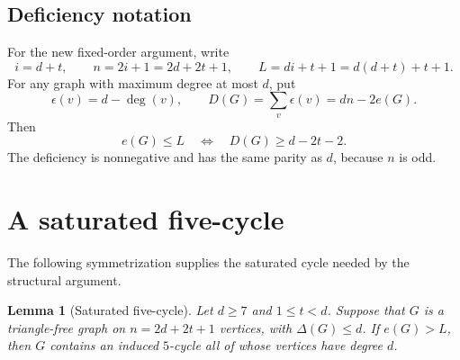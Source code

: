 \documentclass[11pt]{article}
\newtheorem{lemma}[theorem]{Lemma}
\theoremstyle{definition}
\theoremstyle{remark}
\begin{document}
\subsection{Deficiency notation}

For the new fixed-order argument, write
\[
  i=d+t,\qquad n=2i+1=2d+2t+1,\qquad
  L=di+t+1=d(d+t)+t+1.
\]
For any graph with maximum degree at most $d$, put
\[
  \epsilon(v)=d-\deg(v),\qquad D(G)=\sum_v\epsilon(v)=dn-2e(G).
\]
Then
\begin{equation}\label{eq:target-deficiency}
  e(G)\le L\quad\Longleftrightarrow\quad D(G)\ge d-2t-2.
\end{equation}
The deficiency is nonnegative and has the same parity as $d$, because $n$
is odd.

\section{A saturated five-cycle}\label{sec:saturated-cycle}

The following symmetrization supplies the saturated cycle needed by the structural argument.

\begin{lemma}[Saturated five-cycle]\label{lem:saturated-cycle}
Let $d\ge7$ and $1\le t<d$. Suppose that $G$ is a triangle-free graph on
$n=2d+2t+1$ vertices, with $\Delta(G)\le d$. If $e(G)>L$, then $G$ contains
an induced $5$-cycle all of whose vertices have degree $d$.
\end{lemma}
\end{document}
